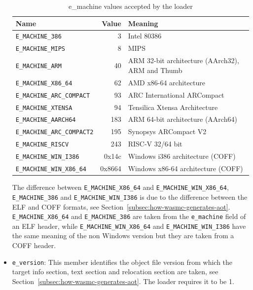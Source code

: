\documentclass{article}
\begin{document}
\begin{itemize}
        \begin{table}[H]
        \centering
        \begin{tabular}{lrl}
            \hline
            Name & Value & Meaning \\
            \hline
            \verb|E_MACHINE_386|          &      3 & Intel 80386 \\
            \verb|E_MACHINE_MIPS|         &      8 & MIPS \\
            \verb|E_MACHINE_ARM|          &     40 & ARM 32-bit architecture (AArch32), ARM and Thumb \\
            \verb|E_MACHINE_X86_64|       &     62 & AMD x86-64 architecture \\
            \verb|E_MACHINE_ARC_COMPACT|  &     93 & ARC International ARCompact \\
            \verb|E_MACHINE_XTENSA|       &     94 & Tensilica Xtensa Architecture \\
            \verb|E_MACHINE_AARCH64|      &    183 & ARM 64-bit architecture (AArch64) \\
            \verb|E_MACHINE_ARC_COMPACT2| &    195 & Synopsys ARCompact V2 \\
            \verb|E_MACHINE_RISCV|        &    243 & RISC-V 32/64 bit \\
            \verb|E_MACHINE_WIN_I386|     &  0x14c & Windows i386 architecture (COFF) \\
            \verb|E_MACHINE_WIN_X86_64|   & 0x8664 & Windows x86-64 architecture (COFF) \\
            \hline
        \end{tabular}
        \caption{e\_machine values accepted by the loader}
        \label{table:e-machine-legal-values}
        \end{table}

        The difference between \verb|E_MACHINE_X86_64| and \verb|E_MACHINE_WIN_X86_64|, \verb|E_MACHINE_386| and \verb|E_MACHINE_WIN_I386| is due to the difference between the ELF and COFF formats, see Section~\ref{subsec:how-wasmc-generates-aot}.
        \verb|E_MACHINE_X86_64| and \verb|E_MACHINE_386| are taken from the \verb|e_machine| field of an ELF header, while \verb|E_MACHINE_WIN_X86_64| and \verb|E_MACHINE_WIN_I386| have the same meaning of the non Windows version but they are taken from a COFF header.

    \item \verb|e_version|:
        This member identifies the object file version from which the target info section, text section and relocation section are taken, see Section~\ref{subsec:how-wasmc-generates-aot}.
        The loader requires it to be 1.


\end{itemize}
\end{document}
